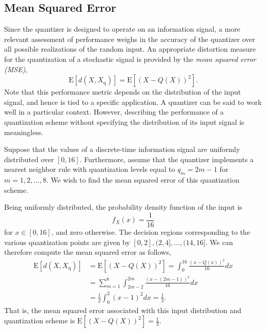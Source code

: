 \subsection{Mean Squared Error}

Since the quantizer is designed to operate on an information signal, a more relevant assessment of performance weighs in the accuracy of the quantizer over all possible realizations of the random input.
An appropriate distortion measure for the quantization of a stochastic signal is provided by the \emph{mean squared error (MSE)},
\begin{equation} \label{equation:QuantizationMSE}
\mathrm{E} [ d(X, X_{\mathrm{q}}) ]
= \mathrm{E} \left[ (X - Q(X))^2 \right] .
\end{equation}
Note that this performance metric depends on the distribution of the input signal, and hence is tied to a specific application.
A quantizer can be said to work well in a particular context.
However, describing the performance of a quantization scheme without specifying the distribution of its input signal is meaningless.

\begin{example} \label{example:UniformQuantizer}
Suppose that the values of a discrete-time information signal are uniformly distributed over $[0,16]$.
Furthermore, assume that the quantizer implements a nearest neighbor rule with quantization levels equal to $q_m = 2m - 1$ for $m = 1, 2, \ldots, 8$.
We wish to find the mean squared error of this quantization scheme.

Being uniformly distributed, the probability density function of the input is
\begin{equation*}
f_X (x) = \frac{1}{16}
\end{equation*}
for $x \in [0, 16]$, and zero otherwise.
The decision regions corresponding to the various quantization points are given by $[0, 2], (2, 4], \ldots, (14, 16]$.
We can therefore compute the mean squared error as follows,
\begin{equation*}
\begin{split}
\mathrm{E} [ d(X, X_{\mathrm{q}}) ]
&= \mathrm{E} \left[ (X - Q(X))^2 \right]
= \int_0^{16} \frac{(x - Q(x))^2}{16} dx \\
&= \sum_{m=1}^8 \int_{2m-2}^{2m} \frac{(x - (2m - 1))^2}{16} dx \\
&= \frac{1}{2} \int_{0}^{2} (x - 1)^2 dx = \frac{1}{3} .
\end{split}
\end{equation*}
That is, the mean squared error associated with this input distribution and quantization scheme is $\mathrm{E} \left[ (X - Q(X))^2 \right] = \frac{1}{3}$.
\end{example}



